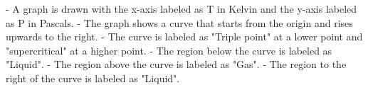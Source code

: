 - A graph is drawn with the x-axis labeled as T in Kelvin and the y-axis labeled as P in Pascals.
- The graph shows a curve that starts from the origin and rises upwards to the right.
- The curve is labeled as "Triple point" at a lower point and "supercritical" at a higher point.
- The region below the curve is labeled as "Liquid".
- The region above the curve is labeled as "Gas".
- The region to the right of the curve is labeled as "Liquid".